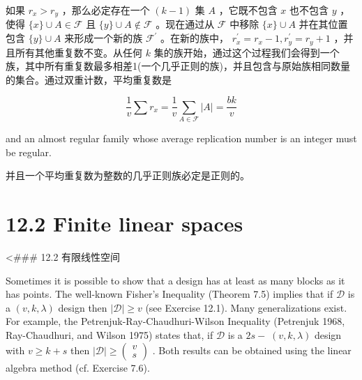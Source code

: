 \documentclass[10pt]{article}
\begin{document}
\begin{tcolorbox}\relax
如果 \({r}_{x} > {r}_{y}\) ，那么必定存在一个 \(\left( {k - 1}\right)\) 集 \(A\) ，它既不包含 \(x\) 也不包含 \(y\) ，使得 \(\{ x\}  \cup  A \in  \mathcal{F}\) 且 \(\{ y\}  \cup  A \notin  \mathcal{F}\) 。现在通过从 \(\mathcal{F}\) 中移除 \(\{ x\}  \cup  A\) 并在其位置包含 \(\{ y\}  \cup  A\) 来形成一个新的族 \({\mathcal{F}}^{\prime }\) 。在新的族中， \({r}_{x}^{\prime } = {r}_{x} - 1,{r}_{y}^{\prime } = {r}_{y} + 1\) ，并且所有其他重复数不变。从任何 \(k\) 集的族开始，通过这个过程我们会得到一个族，其中所有重复数最多相差1(一个几乎正则的族)，并且包含与原始族相同数量的集合。通过双重计数，平均重复数是
\end{tcolorbox}

\[
\frac{1}{v}\sum {r}_{x} = \frac{1}{v}\mathop{\sum }\limits_{{A \in  \mathcal{F}}}\left| A\right|  = \frac{bk}{v}
\]

and an almost regular family whose average replication number is an integer must be regular.

\begin{tcolorbox}\relax
并且一个平均重复数为整数的几乎正则族必定是正则的。
\end{tcolorbox}

\section*{12.2 Finite linear spaces}

\begin{tcolorbox}\relax
<\#\#\# 12.2 有限线性空间
\end{tcolorbox}

Sometimes it is possible to show that a design has at least as many blocks as it has points. The well-known Fisher's Inequality (Theorem 7.5) implies that if \(\mathcal{D}\) is a \(\left( {v,k,\lambda }\right)\) design then \(\left| \mathcal{D}\right|  \geq  v\) (see Exercise 12.1). Many generalizations exist. For example, the Petrenjuk-Ray-Chaudhuri-Wilson Inequality (Petrenjuk 1968, Ray-Chaudhuri, and Wilson 1975) states that, if \(\mathcal{D}\) is a \({2s} - \; \left( {v,k,\lambda }\right)\) design with \(v \geq  k + s\) then \(\left| \mathcal{D}\right|  \geq  \left( \begin{array}{l} v \\  s \end{array}\right)\) . Both results can be obtained using the linear algebra method (cf. Exercise 7.6).
\end{document}

